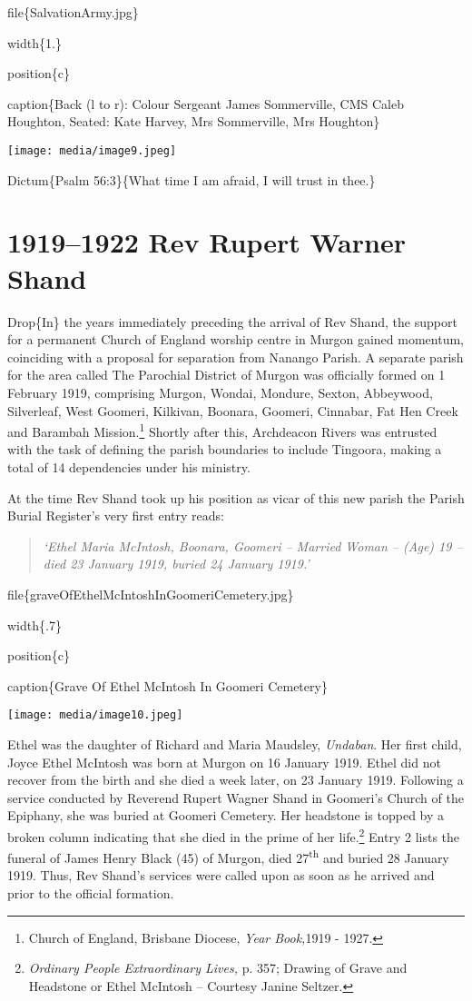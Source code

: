 file\{SalvationArmy.jpg\}

width\{1.\}

position\{c\}

caption\{Back (l to r): Colour Sergeant James Sommerville, CMS Caleb Houghton, Seated: Kate Harvey, Mrs Sommerville, Mrs Houghton\}

\texttt{[image: media/image9.jpeg]}

Dictum\{Psalm 56:3\}\{What time I am afraid, I will trust in thee.\}

\hypertarget{rev-rupert-warner-shand}{%
\chapter{1919--1922 Rev Rupert Warner Shand}\label{rev-rupert-warner-shand}}

Drop\{In\} the years immediately preceding the arrival of Rev Shand, the support for a permanent Church of England worship centre in Murgon gained momentum, coinciding with a proposal for separation from Nanango Parish. A separate parish for the area called The Parochial District of Murgon was officially formed on 1 February 1919, comprising Murgon, Wondai, Mondure, Sexton, Abbeywood, Silverleaf, West Goomeri, Kilkivan, Boonara, Goomeri, Cinnabar, Fat Hen Creek and Barambah Mission.\footnote{Church of England, Brisbane Diocese, \emph{Year Book,}1919 - 1927.} Shortly after this, Archdeacon Rivers was entrusted with the task of defining the parish boundaries to include Tingoora, making a total of 14 dependencies under his ministry.

At the time Rev Shand took up his position as vicar of this new parish the Parish Burial Register's very first entry reads:

\begin{quote}
\emph{`Ethel Maria McIntosh, Boonara, Goomeri -- Married Woman -- (Age) 19 -- died 23 January 1919, buried 24 January 1919.'}
\end{quote}

file\{graveOfEthelMcIntoshInGoomeriCemetery.jpg\}

width\{.7\}

position\{c\}

caption\{Grave Of Ethel McIntosh In Goomeri Cemetery\}

\texttt{[image: media/image10.jpeg]}

Ethel was the daughter of Richard and Maria Maudsley, \emph{Undaban}. Her first child, Joyce Ethel McIntosh was born at Murgon on 16 January 1919. Ethel did not recover from the birth and she died a week later, on 23 January 1919. Following a service conducted by Reverend Rupert Wagner Shand in Goomeri's Church of the Epiphany, she was buried at Goomeri Cemetery. Her headstone is topped by a broken column indicating that she died in the prime of her life.\footnote{\emph{Ordinary People Extraordinary Lives,} p. 357; Drawing of Grave and Headstone or Ethel McIntosh -- Courtesy Janine Seltzer.} Entry 2 lists the funeral of James Henry Black (45) of Murgon, died 27\textsuperscript{th} and buried 28 January 1919. Thus, Rev Shand's services were called upon as soon as he arrived and prior to the official formation.

